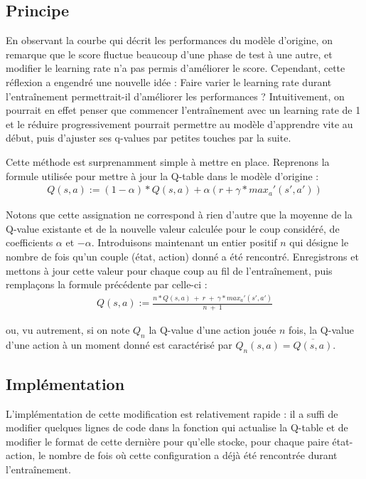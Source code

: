 \documentclass[french]{article}
\begin{document}
    \subsection{Principe}

    En observant la courbe qui décrit les performances du modèle d'origine, on remarque que le score fluctue beaucoup d'une phase de test à une autre, et modifier le learning rate n'a pas permis d'améliorer le score. Cependant, cette réflexion a engendré une nouvelle idée : Faire varier le learning rate durant l'entraînement permettrait-il d'améliorer les performances ? Intuitivement, on pourrait en effet penser que commencer l'entraînement avec un learning rate de 1 et le réduire progressivement pourrait permettre au modèle d'apprendre vite au début, puis d'ajuster ses q-values par petites touches par la suite.

    Cette méthode est surprenamment simple à mettre en place. Reprenons la formule utilisée pour mettre à jour la Q-table dans le modèle d'origine :
    \begin{align*}
        Q(s,a) := (1-\alpha)*Q(s,a) + \alpha(r + \gamma * max_a'(s',a'))
    \end{align*}

    Notons que cette assignation ne correspond à rien d'autre que la moyenne de la Q-value existante et de la nouvelle valeur calculée pour le coup considéré, de coefficients $\alpha$ et $-\alpha$. Introduisons maintenant un entier positif $n$ qui désigne le nombre de fois qu'un couple (état, action) donné a été rencontré. Enregistrons et mettons à jour cette valeur pour chaque coup au fil de l'entraînement, puis remplaçons la formule précédente par celle-ci :
    \begin{align*}
        Q(s,a) := \frac{n*Q(s,a) \:+ \:r \:+ \:\gamma * max_a'(s',a')}{n\:+\:1}
    \end{align*}

    ou, vu autrement, si on note $Q_n$ la Q-value d'une action jouée $n$ fois, la Q-value d'une action à un moment donné est caractérisé par $Q_n(s,a) = \overline{Q(s,a)}$.

    \subsection{Implémentation}

    L'implémentation de cette modification est relativement rapide : il a suffi de modifier quelques lignes de code dans la fonction qui actualise la Q-table et de modifier le format de cette dernière pour qu'elle stocke, pour chaque paire état-action, le nombre de fois où cette configuration a déjà été rencontrée durant l'entraînement.
\end{document}
